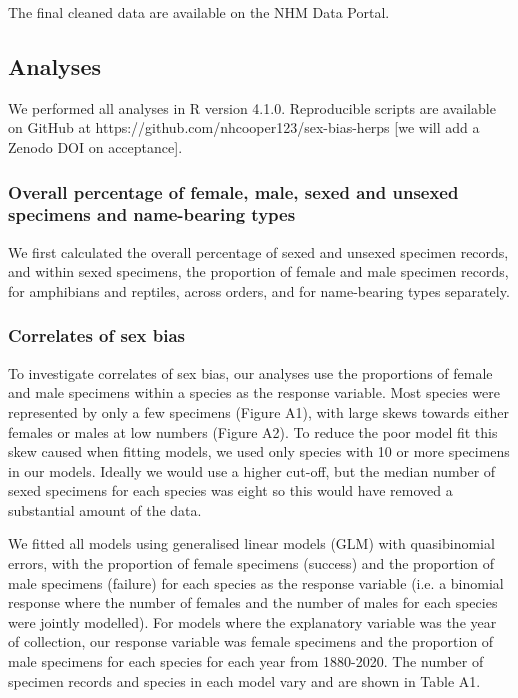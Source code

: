 \documentclass[a4paper, 12pt]{article}
\begin{document}
The final cleaned data are available on the NHM Data Portal\cite{herp-data}. 

\subsection{Analyses}

We performed all analyses in R version 4.1.0\cite{R}. 
Reproducible scripts are available on GitHub at https://github.com/nhcooper123/sex-bias-herps \cite{herp-code2022} [we will add a Zenodo DOI on acceptance].

\subsubsection{Overall percentage of female, male, sexed and unsexed specimens and name-bearing types}
We first calculated the overall percentage of sexed and unsexed specimen records, and within sexed specimens, the proportion of female and male specimen records, for amphibians and reptiles, across orders, and for name-bearing types separately. 

\subsubsection{Correlates of sex bias}
To investigate correlates of sex bias, our analyses use the proportions of female and male specimens within a species as the response variable. 
Most species were represented by only a few specimens (Figure A1), with large skews towards either females or males at low numbers (Figure A2). 
To reduce the poor model fit this skew caused when fitting models, we used only species with 10 or more specimens in our models. 
Ideally we would use a higher cut-off, but the median number of sexed specimens for each species was eight so this would have removed a substantial amount of the data. 

We fitted all models using generalised linear models (GLM) with quasibinomial errors, with the proportion of female specimens (success) and the proportion of male specimens (failure) for each species as the response variable (i.e. a binomial response where the number of females and the number of males for each species were jointly modelled). 
For models where the explanatory variable was the year of collection, our response variable was female specimens and the proportion of male specimens for each species for each year from 1880-2020. 
The number of specimen records and species in each model vary and are shown in Table A1.
\end{document}
